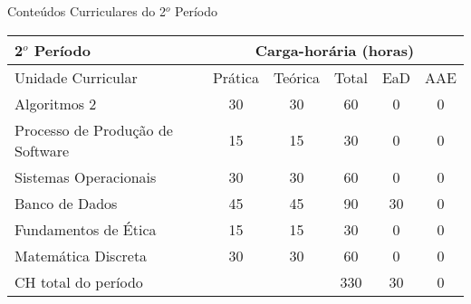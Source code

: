 \begin{quadro}[ht!]
\centering
\caption{Conteúdos Curriculares do 2$^o$ Período}\label{qua:periodo2}
\begin{tabular}{|p{5.0cm}|c|c|c|c|c|}
\hline
\rowcolor{blue1} 2$^o$ Período & \multicolumn{5}{|c|}{\centering Carga-horária (horas)} \\ \hline
\rowcolor{blue1} Unidade Curricular & Prática & Teórica & Total & EaD & AAE \\ \hline
Algoritmos 2 & 30 & 30 & 60 & 0	&	0 \\	\hline
Processo de Produção de Software & 15 & 15 & 30 & 0	&	0 \\	\hline
Sistemas Operacionais & 30 & 30 & 60 & 0	&	0 \\	\hline
Banco de Dados & 45 & 45 & 90 & 30	&	0 \\	\hline
Fundamentos de Ética & 15 & 15 & 30 & 0	&	0 \\	\hline
Matemática Discreta & 30 & 30 & 60 & 0	&	0 \\	\hline
CH total do período & \multicolumn{2}{p{3.3cm}|}{\cellcolor{blue1}} & 330 & 30	&	0 \\ \hline
\end{tabular} \end{quadro}